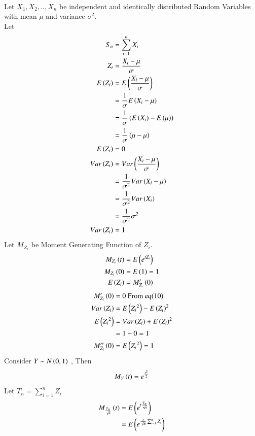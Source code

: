 \documentclass[journal,12pt,twocolumn]{IEEEtran}
\begin{document}
\begin{enumerate}[label=(\Roman*), align=left]
\\Let $X_1,X_2,..,X_n$ be independent and identically distributed Random Variables with mean $\mu$ and variance $\sigma^2$.
\\Let
\begin{align}
    S_n &= \sum_{i=1}^{n} X_i\\
    Z_i &= \frac{X_i-\mu}{\sigma}\\
    E\left(Z_i\right)&=E\left(\frac{X_i-\mu}{\sigma}\right)\\
    &= \frac{1}{\sigma}E\left(X_i - \mu\right)\nonumber\\
    &= \frac{1}{\sigma}\left(E\left(X_i\right)-E\left(\mu\right)\right)\nonumber\\
    &= \frac{1}{\sigma}\left(\mu -\mu\right)\nonumber\\
    E\left(Z_i\right)&=0\\
    Var\left(Z_i\right)&=Var\left(\frac{X_i-\mu}{\sigma}\right)\\
    &=\frac{1}{\sigma^2}Var\left(X_i-\mu\right)\nonumber\\
    &=\frac{1}{\sigma^2}Var\left(X_i\right)\nonumber\\
    &=\frac{1}{\sigma^2}\sigma^2\nonumber\\
    Var\left(Z_i\right)&=1
    \end{align}
Let $M_{Z_i}$ be Moment Generating Function of $Z_i$.
\begin{align}
      M_{Z_i}\left(t\right)&=E\left(e^{tZ_i}\right)\\
      M_{Z_i}\left(0\right)&=E\left(1\right)=1\\
      E\left(Z_i\right)&=M_{Z_i}'\left(0\right)
        \end{align}
\begin{align}
      M_{Z_i}'\left(0\right)&=0 \text{ From eq(10)}\\
      Var\left(Z_i\right)&=E\left({Z_i}^2\right)-{E\left(Z_i\right)^2}\\
      E\left({Z_i}^2\right)&=Var\left(Z_i\right)+E\left(Z_i\right)^2\nonumber\\
      &=1-0=1\nonumber\\
      M_{Z_i}''\left(0\right)&=E\left({Z_i}^2\right)=1
    \end{align}
Consider $Y \sim N\left(0,1\right)$ , Then
\begin{align}
    M_Y\left(t\right)=e^{\frac{t^2}{2}}
    \end{align}
Let $T_n=\sum_{i=1}^{n} Z_i$
\begin{align}
    M_{\frac{T_n}{\sqrt{n}}}\brak{t}&=E\brak{e^{t\frac{T_n}{\sqrt{n}}}}\\
    &=E\brak{e^{\frac{t}{\sqrt{n}}\sum_{i=1}^{n} Z_i}}\nonumber\\

\end{align}
\end{enumerate}
\end{document}
